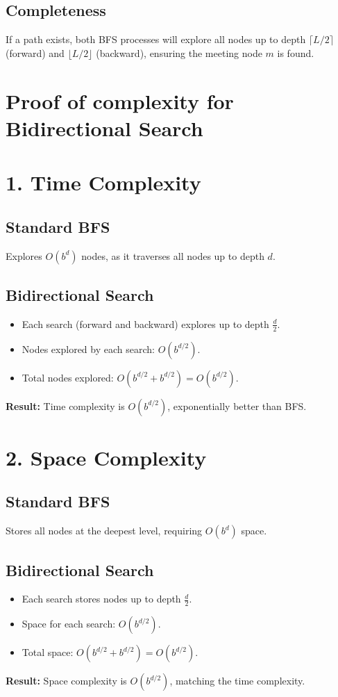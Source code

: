 \begin{appendices}
\subsection*{Completeness}
If a path exists, both BFS processes will explore all nodes up to depth $\lceil L/2 \rceil$ (forward) and $\lfloor L/2 \rfloor$ (backward), ensuring the meeting node $m$ is found.

\section{Proof of complexity for Bidirectional Search}\label{appendix:Bidirectional:complexity}
\section*{1. Time Complexity}
\subsection*{Standard BFS}
Explores $O(b^d)$ nodes, as it traverses all nodes up to depth $d$.

\subsection*{Bidirectional Search}
\begin{itemize}
	\item Each search (forward and backward) explores up to depth $\frac{d}{2}$.
	\item Nodes explored by each search: $O(b^{d/2})$.
	\item Total nodes explored: $O(b^{d/2} + b^{d/2}) = O(b^{d/2})$.
\end{itemize}
\textbf{Result:} Time complexity is $O(b^{d/2})$, exponentially better than BFS.

\section*{2. Space Complexity}
\subsection*{Standard BFS}
Stores all nodes at the deepest level, requiring $O(b^d)$ space.

\subsection*{Bidirectional Search}
\begin{itemize}
	\item Each search stores nodes up to depth $\frac{d}{2}$.
	\item Space for each search: $O(b^{d/2})$.
	\item Total space: $O(b^{d/2} + b^{d/2}) = O(b^{d/2})$.
\end{itemize}
\textbf{Result:} Space complexity is $O(b^{d/2})$, matching the time complexity.


\end{appendices}
